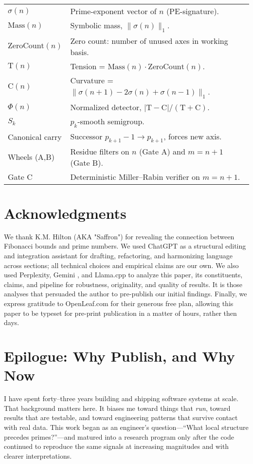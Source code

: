 \documentclass[11pt]{article}
\theoremstyle{plain}
\theoremstyle{definition}
\newcommand{\mass}{\mathrm{Mass}}                            %
\newcommand{\zcount}{\mathrm{ZeroCount}}                    %
\newcommand{\tension}{\mathrm{T}}                           %
\newcommand{\curv}{\mathrm{C}}                              %
\newcommand{\phidet}{\Phi}                                  %
\begin{document}
\begin{tabular}{ll}
$\sigma(n)$ & Prime-exponent vector of $n$ (PE-signature). \\
$\mass(n)$ & Symbolic mass, $\|\sigma(n)\|_1$. \\
$\zcount(n)$ & Zero count: number of unused axes in working basis. \\
$\tension(n)$ & Tension = $\mass(n)\cdot\zcount(n)$. \\
$\curv(n)$ & Curvature = $\|\sigma(n+1)-2\sigma(n)+\sigma(n-1)\|_1$. \\
$\phidet(n)$ & Normalized detector, $|\tension-\curv|/(\tension+\curv)$. \\
$S_k$ & $p_k$-smooth semigroup. \\
Canonical carry & Successor $p_{k+1}-1 \to p_{k+1}$, forces new axis. \\
Wheels (A,B) & Residue filters on $n$ (Gate A) and $m=n+1$ (Gate B). \\
Gate C & Deterministic Miller–Rabin verifier on $m=n+1$. \\
\end{tabular}

\section*{Acknowledgments}
We thank K.M. Hilton (AKA "Saffron") for revealing the connection between Fibonacci bounds and prime numbers.  We used ChatGPT as a structural editing and integration assistant for drafting, refactoring, and harmonizing language across sections; all technical choices and empirical claims are our own.  We also used Perplexity, Gemini , and Llama.cpp to analyze this paper, its constituents, claims, and pipeline for robustness, originality, and quality of results.  It is those analyses that persuaded the author to pre-publish our initial findings.   Finally, we express gratitude to OpenLeaf.com for their generous free plan, allowing this paper to be typeset for pre-print publication in a matter of hours, rather then days.  

\section*{Epilogue: Why Publish, and Why Now}

I have spent forty–three years building and shipping software systems at scale. That background matters here. It biases me toward things that \emph{run}, toward results that are testable, and toward engineering patterns that survive contact with real data. This work began as an engineer’s question—“What local structure precedes primes?”—and matured into a research program only after the code continued to reproduce the same signals at increasing magnitudes and with clearer interpretations.
\end{document}
